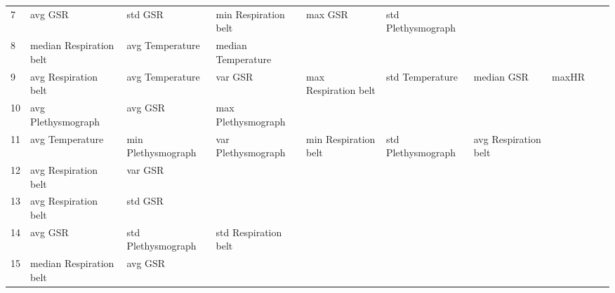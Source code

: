 \begin{landscape}
\begin{table}[]
\begin{tabular}{l|llllllll}
7        & avg GSR                 & std GSR                 & min Respiration belt    & max GSR                 & std Plethysmograph      &                       &                         &                         &                         &         \\
8        & median Respiration belt & avg Temperature         & median Temperature      &                         &                         &                       &                         &                         &                         &         \\
9        & avg Respiration belt    & avg Temperature         & var GSR                 & max Respiration belt    & std Temperature         & median GSR            & maxHR                   &                         &                         &         \\
10       & avg Plethysmograph      & avg GSR                 & max Plethysmograph      &                         &                         &                       &                         &                         &                         &         \\
11       & avg Temperature         & min Plethysmograph      & var Plethysmograph      & min Respiration belt    & std Plethysmograph      & avg Respiration belt  &                         &                         &                         &         \\
12       & avg Respiration belt    & var GSR                 &                         &                         &                         &                       &                         &                         &                         &         \\
13       & avg Respiration belt    & std GSR                 &                         &                         &                         &                       &                         &                         &                         &         \\
14       & avg GSR                 & std Plethysmograph      & std Respiration belt    &                         &                         &                       &                         &                         &                         &         \\
15       & median Respiration belt & avg GSR                 &                         &                         &                         &                       &                         &                         &                         &         \\

\end{tabular}
\end{table}
\end{landscape}
